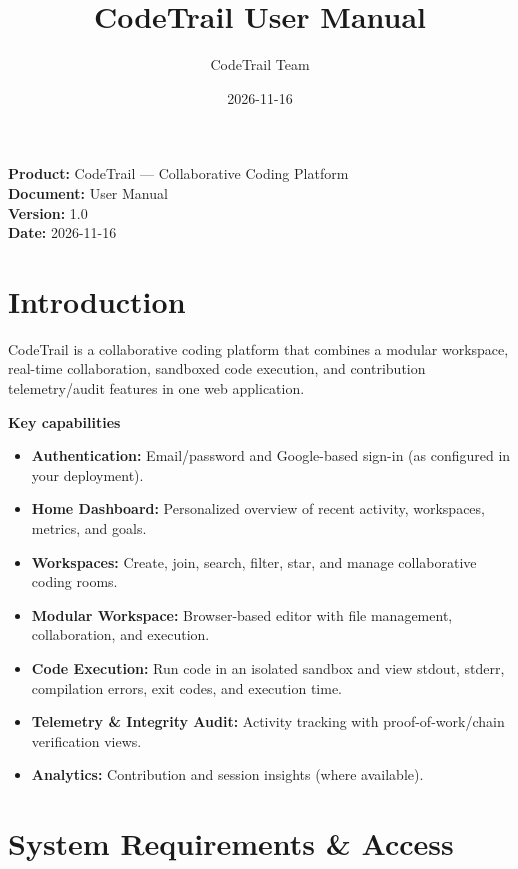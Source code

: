 \documentclass[11pt,a4paper]{article}
\title{\textbf{CodeTrail User Manual}}
\author{CodeTrail Team}
\date{2026-11-16}
\begin{document}
\maketitle

\begin{center}
\textbf{Product:} CodeTrail — Collaborative Coding Platform \\
\textbf{Document:} User Manual \\
\textbf{Version:} 1.0 \\
\textbf{Date:} 2026-11-16
\end{center}

\tableofcontents
\newpage

\section{Introduction}

CodeTrail is a collaborative coding platform that combines a modular workspace, real-time collaboration, sandboxed code execution, and contribution telemetry/audit features in one web application.

\textbf{Key capabilities}
\begin{itemize}
  \item \textbf{Authentication:} Email/password and Google-based sign-in (as configured in your deployment).
  \item \textbf{Home Dashboard:} Personalized overview of recent activity, workspaces, metrics, and goals.
  \item \textbf{Workspaces:} Create, join, search, filter, star, and manage collaborative coding rooms.
  \item \textbf{Modular Workspace:} Browser-based editor with file management, collaboration, and execution.
  \item \textbf{Code Execution:} Run code in an isolated sandbox and view stdout, stderr, compilation errors, exit codes, and execution time.
  \item \textbf{Telemetry \& Integrity Audit:} Activity tracking with proof-of-work/chain verification views.
  \item \textbf{Analytics:} Contribution and session insights (where available).
\end{itemize}

\section{System Requirements \& Access}
\end{document}
